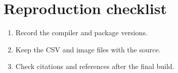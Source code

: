 \chapter{Reproduction checklist}
\begin{enumerate}
\item Record the compiler and package versions.
\item Keep the CSV and image files with the source.
\item Check citations and references after the final build.
\end{enumerate}

